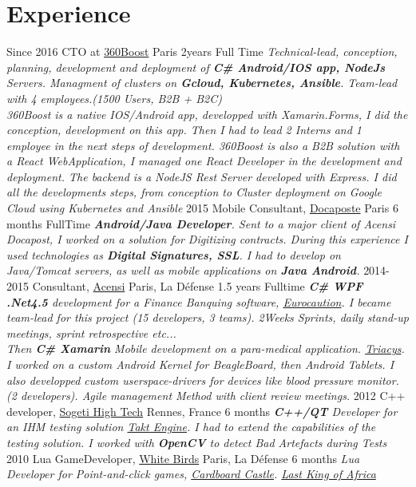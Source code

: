 \documentclass{emonides-cv}
\begin{document}
\section{Experience}
\begin{entrylist}
  \entry
    {Since  2016}
    {CTO at \href{https://360boost.com/}{360Boost}  {\normalfont Paris}}
    {2years Full Time}
    {\emph{Technical-lead, conception, planning, development and deployment of \textbf{C\# Android/IOS app, NodeJs} Servers.
     Managment of clusters on \textbf{Gcloud, Kubernetes, Ansible}. Team-lead with 4 employees.(1500 Users, B2B + B2C)
    \\360Boost is a native IOS/Android app, developped with Xamarin.Forms, I did the conception, development on this app.
    Then I had to lead 2 Interns and 1 employee in the next steps of development.
    360Boost is also a B2B solution with a React WebApplication, I managed one React Developer
    in the development and deployment.
    The backend is a NodeJS Rest Server developed with Express. I did all the developments steps, from conception 
    to Cluster deployment on Google Cloud using Kubernetes and Ansible}}
  \entry
    {2015}
    {Mobile Consultant, \href{https://www.docapost.com/en/}{Docaposte} {\normalfont Paris}}
    {6 months FullTime}
    {\emph{\textbf{Android/Java Developer}. Sent to a major client of Acensi Docapost, I worked on a solution for Digitizing contracts.
    During this experience I used technologies as \textbf{Digital Signatures, SSL}.
    I had to develop on Java/Tomcat servers, as well as mobile applications on \textbf{Java Android}.}}
  \entry
    {2014-2015}
    {Consultant, \href{https://www.acensi.fr/}{Acensi} {\normalfont Paris, La Défense}}
    {1.5 years Fulltime}
    {\emph{\textbf{C\# WPF .Net4.5} development for a Finance Banquing software, \href{https://www.eurocaution.net/}{Eurocaution}.
    I became team-lead for this project (15 developers, 3 teams). 2Weeks Sprints, daily stand-up meetings, sprint retrospective etc...
    \\Then \textbf{C\# Xamarin} Mobile development on a para-medical application. \href{http://www.triacys.com/}{Triacys}.
    I worked on a custom Android Kernel for BeagleBoard, then Android Tablets. I also developped custom userspace-drivers for devices like blood pressure monitor.
    (2 developers). Agile management Method with client review meetings. }}
  \entry
    {2012}
    {C++ developer, \href{https://www.acensi.fr/}{Sogeti High Tech} {\normalfont Rennes, France}}
    {6 months}
    {\emph{\textbf{C++/QT} Developer for an IHM testing solution \href{https://www.eurocaution.net/}{Takt Engine}.
    I had to extend the capabilities of the testing solution. I worked with \textbf{OpenCV} to detect Bad Artefacts during Tests }}
  \entry
    {2010}
    {Lua GameDeveloper, \href{https://www.giantbomb.com/white-birds-productions/3010-5637/}{White Birds} {\normalfont Paris, La Défense}}
    {6 months}
    {\emph{Lua Developer for Point-and-click games, \href{https://www.bigfishgames.com/games/6859/cardboard-castle/}{Cardboard Castle}. \href{https://www.wikiwand.com/fr/White_Birds_Productions}{Last King of Africa}}}
\end{entrylist}
\end{document}
